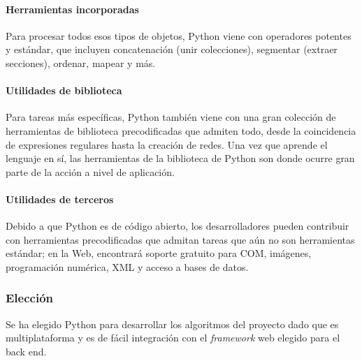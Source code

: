\paragraph*{Herramientas incorporadas}
Para procesar todos esos tipos de objetos, Python viene con operadores potentes y estándar, que incluyen concatenación (unir colecciones), segmentar (extraer secciones), ordenar, mapear y más.
\paragraph*{Utilidades de biblioteca}
Para tareas más específicas, Python también viene con una gran colección de herramientas de biblioteca precodificadas que admiten todo, desde la coincidencia de expresiones regulares hasta la creación de redes. Una vez que aprende el lenguaje en sí, las herramientas de la biblioteca de Python son donde ocurre gran parte de la acción a nivel de aplicación.
\paragraph*{Utilidades de terceros}
Debido a que Python es de código abierto, los desarrolladores pueden contribuir con herramientas precodificadas que admitan tareas que aún no son herramientas estándar; en la Web, encontrará soporte gratuito para COM, imágenes, programación numérica, XML y acceso a bases de datos.


\subsubsection*{Elección}
Se ha elegido Python para desarrollar los algoritmos del proyecto dado que es multiplataforma y es de fácil integración con el \textit{framework} web elegido para el back end.